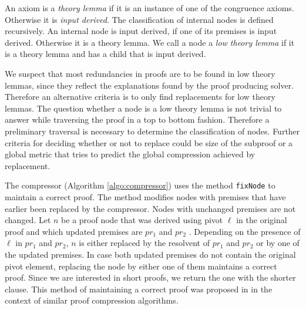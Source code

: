 \begin{definition}

An axiom is a \emph{theory lemma} if it is an instance of one of the congruence axioms.
Otherwise it is \emph{input derived}.
The classification of internal nodes is defined recursively.
An internal node is input derived, if one of its premises is input derived.
Otherwise it is a theory lemma.
We call a node a \emph{low theory lemma} if it is a theory lemma and has a child that is input derived.

\end{definition}

We suspect that most redundancies in proofs are to be found in low theory lemmas, since they reflect the explanations found by the proof producing solver.
Therefore an alternative criteria is to only find replacements for low theory lemmas.
The question whether a node is a low theory lemma is not trivial to answer while traversing the proof in a top to bottom fashion.
Therefore a preliminary traversal is necessary to determine the classification of nodes.
Further criteria for deciding whether or not to replace could be size of the subproof or a global metric that tries to predict the global compression achieved by replacement.



The compressor (Algorithm \ref{algo:compressor}) uses the method \texttt{fixNode} to maintain a correct proof.
The method modifies nodes with premises that have earlier been replaced by the compressor. 
Nodes with unchanged premises are not changed.
Let $n$ be a proof node that was derived using pivot $\ell$ in the original proof and which updated premises are $pr_1$ and $pr_2$ .
Depending on the presence of $\ell$ in $pr_1$ and $pr_2$, $n$ is either replaced by the resolvent of $pr_1$ and $pr_2$ or by one of the updated premises.
In case both updated premises do not contain the original pivot element, replacing the node by either one of them maintains a correct proof.
Since we are interested in short proofs, we return the one with the shorter clause.
This method of maintaining a correct proof was proposed in \cite{Bar-Ilan2008} in the context of similar proof compression algorithms.



